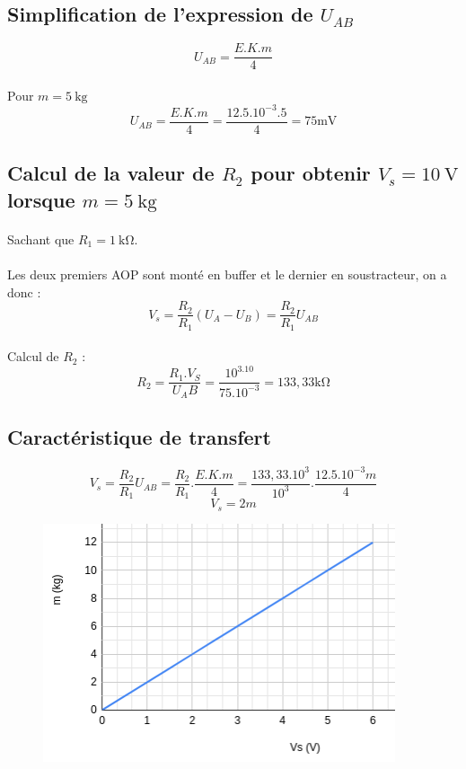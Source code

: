 \documentclass{article}
\begin{document}
\subsection{Simplification de l'expression de $U_{AB}$}
$$U_{AB} = \frac{E.K.m}{4}$$
\paragraph{}Pour $m = \SI{5}{\kilogram}$
$$U_{AB} =  \frac{E.K.m}{4} = \frac{12.5.10^{-3}.5}{4} = 75 \si{\milli\volt}$$

\subsection{Calcul de la valeur de $R_2$ pour obtenir $V_s = \SI{10}{\volt}$ lorsque $m = \SI{5}{\kilogram}$}
\paragraph{}Sachant que $R_1 = \SI{1}{\kilo\ohm}$.
\paragraph{}
Les deux premiers AOP sont monté en buffer et le dernier en soustracteur, on a donc : $$V_s = \frac{R_2}{R_1}(U_A-U_B) = \frac{R_2}{R_1}U_{AB}$$
\paragraph{}Calcul de $R_2$ :
$$R_2 = \frac{R_1.V_S}{U_AB} = \frac{10^3.10}{75.10^{-3}} = 133,33 \si{\kilo\ohm}$$

\subsection{Caractéristique de transfert}
$$V_s = \frac{R_2}{R_1}U_{AB} = \frac{R_2}{R_1}.\frac{E.K.m}{4} = \frac{133,33.10^{3}}{10^{3}}.\frac{12.5.10^{-3}m}{4}$$
$$V_s = 2m$$

\begin{figure}[H]
    \centering
    \includegraphics[width=0.5\linewidth]{./images/cond-balance-caract-transfert.png}
\end{figure}
\end{document}
